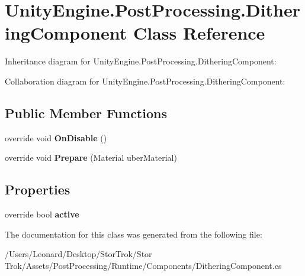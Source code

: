 \hypertarget{class_unity_engine_1_1_post_processing_1_1_dithering_component}{}\section{Unity\+Engine.\+Post\+Processing.\+Dithering\+Component Class Reference}
\label{class_unity_engine_1_1_post_processing_1_1_dithering_component}


Inheritance diagram for Unity\+Engine.\+Post\+Processing.\+Dithering\+Component\+:


Collaboration diagram for Unity\+Engine.\+Post\+Processing.\+Dithering\+Component\+:
\subsection*{Public Member Functions}
\begin{DoxyCompactItemize}
\item 
\mbox{\label{class_unity_engine_1_1_post_processing_1_1_dithering_component_a3972d813f7d1913798fc142e53d8b352}} 
override void {\bfseries On\+Disable} ()
\item 
\mbox{\label{class_unity_engine_1_1_post_processing_1_1_dithering_component_af47fb039901b2434cfe5cd377cf559be}} 
override void {\bfseries Prepare} (Material uber\+Material)
\end{DoxyCompactItemize}
\subsection*{Properties}
\begin{DoxyCompactItemize}
\item 
\mbox{\label{class_unity_engine_1_1_post_processing_1_1_dithering_component_a53ebd6ecdc65f309abd3d0cf47caecf3}} 
override bool {\bfseries active}
\end{DoxyCompactItemize}


The documentation for this class was generated from the following file\+:\begin{DoxyCompactItemize}
\item 
/\+Users/\+Leonard/\+Desktop/\+Stor\+Trok/\+Stor Trok/\+Assets/\+Post\+Processing/\+Runtime/\+Components/Dithering\+Component.\+cs\end{DoxyCompactItemize}
